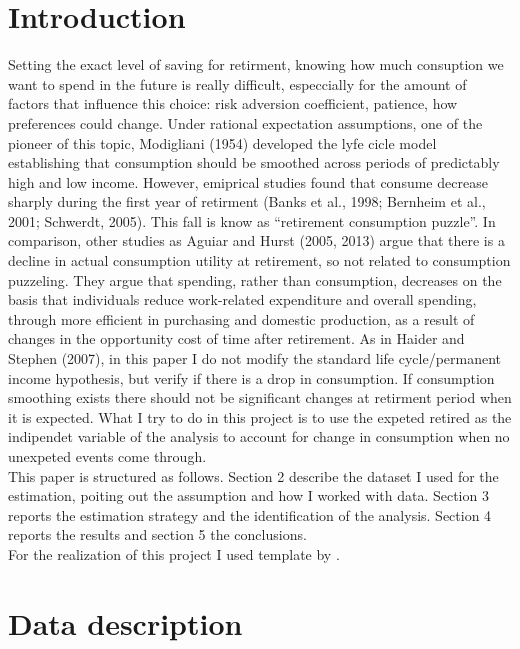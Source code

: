 \section{Introduction} %
\label{sec:introduction}

Setting the exact level of saving for retirment, knowing how much consuption we want to spend in the future is really difficult, especcially for the amount of factors that influence this choice: risk adversion coefficient, patience, how preferences could change. Under rational expectation assumptions, one of the pioneer of this topic, Modigliani (1954) developed the lyfe cicle model establishing that consumption should be smoothed across periods of predictably high and low income. However, emiprical studies found that consume decrease sharply during the first year of retirment (Banks et al., 1998; Bernheim et al., 2001; Schwerdt, 2005). This fall is know as “retirement consumption puzzle”. In comparison, other studies as Aguiar and Hurst (2005, 2013) argue that there is a decline in actual consumption utility at retirement, so not related to consumption puzzeling. They argue that spending, rather than consumption, decreases on the basis that individuals reduce work-related expenditure and overall spending, through more efficient in purchasing and domestic production, as a result of changes in the opportunity cost of time after retirement.
As in Haider and Stephen (2007), in this paper I do not modify the standard life cycle/permanent income hypothesis, but verify if there is a drop in consumption. If consumption smoothing exists there should not be significant changes at retirment period when it is expected. What I try to do in this project is to use the expeted retired as the indipendet variable of the analysis to account for change in consumption when no unexpeted events come through.
\\\hspace*{4mm} This paper is structured as follows. Section 2 describe the dataset I used for the estimation, poiting out the assumption and how I worked with data. Section 3 reports the estimation strategy and the identification of the analysis. Section 4 reports the results and section 5 the conclusions.
\\\hspace*{4mm}   For the realization of this project I used template by \citet{GaudeckerEconProjectTemplates}.

\section{Data description}
\label{sec:data-description}

